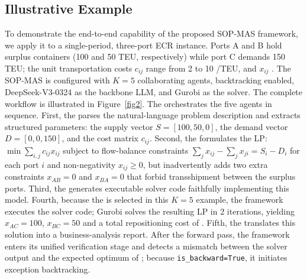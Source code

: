 \documentclass[preprint,12pt]{elsarticle}
\begin{document}
\subsection{Illustrative Example}\label{sec:illustrative_example}

To demonstrate the end-to-end capability of the proposed SOP-MAS framework, we apply it to a single-period, three-port ECR instance. Ports A and B hold surplus containers (100 and 50 TEU, respectively) while port C demands 150 TEU; the unit transportation costs $c_{ij}$ range from 2 to 10 \textyen/TEU, and $x_{ij}$ . The SOP-MAS is configured with $K{=}5$ collaborating agents, backtracking enabled, DeepSeek-V3-0324 as the backbone LLM, and Gurobi as the solver. The complete workflow is illustrated in Figure~\ref{fig2}.
The  orchestrates the five agents in sequence. First, the  parses the natural-language problem description and extracts structured parameters: the supply vector $S{=}[100,50,0]$, the demand vector $D{=}[0,0,150]$, and the cost matrix $c_{ij}$. Second, the  formulates the LP: $\min \sum_{i,j}c_{ij}x_{ij}$ subject to flow-balance constraints $\sum_j x_{ij}-\sum_j x_{ji}=S_i-D_i$ for each port $i$ and non-negativity $x_{ij}\geq 0$, but inadvertently adds two extra constraints $x_{AB}{=}0$ and $x_{BA}{=}0$ that forbid transshipment between the surplus ports. Third, the  generates executable solver code faithfully implementing this model. Fourth, because the  is selected in this $K{=}5$ example, the framework executes the solver code; Gurobi solves the resulting LP in 2 iterations, yielding $x_{AC}{=}100$, $x_{BC}{=}50$ and a total repositioning cost of . Fifth, the  translates this solution into a business-analysis report. After the forward pass, the framework enters its unified verification stage and detects a mismatch between the solver output and the expected optimum of ; because \texttt{is\_backward=True}, it initiates exception backtracking.
\end{document}
